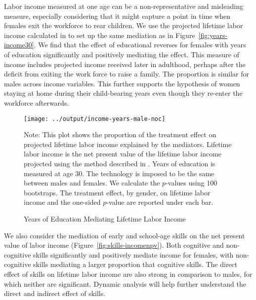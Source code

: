 Labor income measured at one age can be a non-representative and misleading measure, especially considering that it might capture a point in time when females exit the workforce to rear children. We use the projected lifetime labor income calculated in \citet{Garcia_etal_2016_Comp_CBA_Unpublished} to set up the same mediation as in Figure~\ref{fig:years-income30}. We find that the effect of educational reverses for females with years of education significantly and positively mediating the effect. This measure of income includes projected income received later in adulthood, perhaps after the deficit from exiting the work force to raise a family. The proportion is similar for males across income variables. This further supports the hypothesis of women staying at home during their child-bearing years even though they re-enter the workforce afterwards.

\begin{figure}[H]
\begin{center}
\caption{Years of Education Mediating Lifetime Labor Income}
\label{fig:years-incomenpv}
	\texttt{[image: ../output/income-years-male-noc]}
\end{center}
\raggedright
Note: This plot shows the proportion of the treatment effect on projected lifetime labor income explained by the mediators. Lifetime labor income is the net present value of the lifetime labor income projected using the method described in \citet{Garcia_etal_2016_Comp_CBA_Unpublished}. Years of education is measured at age 30. The technology is imposed to be the same between males and females. We calculate the $p$-values using 100 bootstraps. The treatment effect, by gender, on lifetime labor income and the one-sided $p$-value are reported under each bar.
\end{figure}


We also consider the mediation of early and school-age skills on the net present value of labor income (Figure~\ref{fig:skills-incomenpv}). Both cognitive and non-cognitive skills significantly and positively mediate income for females, with non-cognitive skills mediating a larger proportion that cognitive skills. The direct effect of skills on lifetime labor income are also strong in comparison to males, for which neither are significant. Dynamic analysis will help further understand the direct and indirect effect of skills. 

